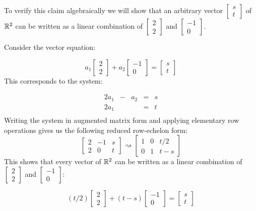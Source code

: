\documentclass{ximera}
\begin{document}
\begin{example}
\begin{explanation}
To verify this claim algebraically we will show that an arbitrary vector $\begin{bmatrix}s\\t\end{bmatrix}$ of $\mathbb{R}^2$ can be written as a linear combination of $\begin{bmatrix}2\\2\end{bmatrix}$ and  $\begin{bmatrix}-1\\0\end{bmatrix}$.  

Consider the vector equation:

$$a_1\begin{bmatrix}2\\2\end{bmatrix}+a_2\begin{bmatrix}-1\\0\end{bmatrix}=\begin{bmatrix}s\\t\end{bmatrix}$$
  This corresponds to the system:
  
  $$\begin{array}{ccccc}
      2a_1 & -&a_2&= &s \\
        2a_1& &&= &t \\
	 \end{array}$$
  Writing the system in augmented matrix form and applying elementary row operations gives us the following reduced row-echelon form:
  $$\left[\begin{array}{cc|c}  
 2&-1&s\\2&0&t
 \end{array}\right]\rightsquigarrow\left[\begin{array}{cc|c}  
 1&0&t/2\\0&1&t-s
 \end{array}\right]$$
This shows that every vector of $\mathbb{R}^2$ can be written as a linear combination of $\begin{bmatrix}2\\2\end{bmatrix}$ and  $\begin{bmatrix}-1\\0\end{bmatrix}$: 

$$(t/2)\begin{bmatrix}2\\2\end{bmatrix}+(t-s)\begin{bmatrix}-1\\0\end{bmatrix}=\begin{bmatrix}s\\t\end{bmatrix}$$


\end{explanation}
\end{example}
\end{document}
